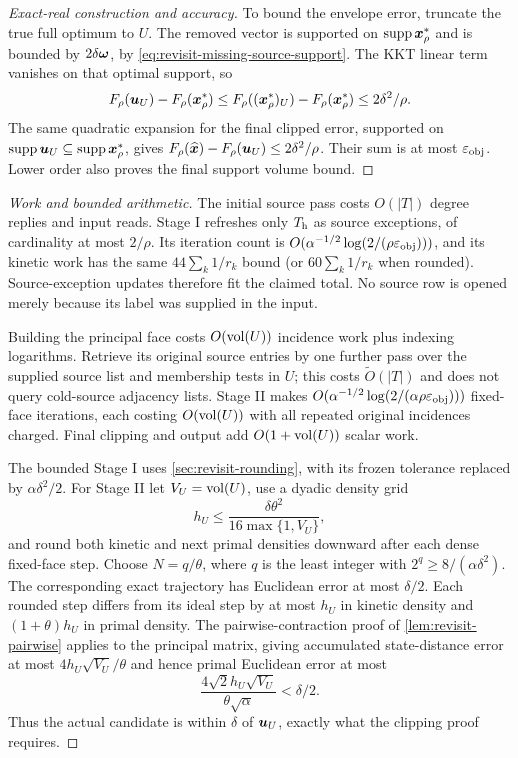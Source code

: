 \begin{proof}[Exact-real construction and accuracy]
To bound the envelope error, truncate the true full optimum to $U$.
The removed vector is supported on $\operatorname{supp}\bm{x}_\rho^*$ and is bounded
by $2\delta\bm{\omega}$, by \cref{eq:revisit-missing-source-support}.
The KKT linear term vanishes on that optimal support, so
\[
 F_\rho(\bm{u}_U)-F_\rho(\bm{x}_\rho^*)
 \leq F_\rho((\bm{x}_\rho^*)_U)-F_\rho(\bm{x}_\rho^*)
 \leq2\delta^2/\rho.
\]
The same quadratic expansion for the final clipped error, supported on
$\operatorname{supp}\bm{u}_U\subseteq\operatorname{supp}\bm{x}_\rho^*$, gives
$F_\rho(\widehat{\bm{x}})-F_\rho(\bm{u}_U)\leq2\delta^2/\rho$.
Their sum is at most $\varepsilon_{\mathrm{obj}}$. Lower order also proves the final support
volume bound.
\end{proof}

\begin{proof}[Work and bounded arithmetic]
The initial source pass costs $O(|T|)$ degree replies and input reads.
Stage I refreshes only $T_{\rm h}$ as source exceptions, of cardinality at
most $2/\rho$. Its iteration count is
$O(\alpha^{-1/2}\log(2/(\rho\varepsilon_{\mathrm{obj}})))$, and its kinetic work has the
same $44\sum_k1/r_k$ bound (or $60\sum_k1/r_k$ when rounded).
Source-exception updates therefore fit the claimed total.
No source row is opened merely because its label was supplied in the input.

Building the principal face costs $O(\operatorname{vol}(U))$ incidence work plus indexing
logarithms. Retrieve its original source entries by one further pass over
the supplied source list and membership tests in $U$; this costs
$\widetilde O(|T|)$ and does not query cold-source adjacency lists.
Stage II makes
$O(\alpha^{-1/2}\log(2/(\alpha\rho\varepsilon_{\mathrm{obj}})))$ fixed-face iterations,
each costing $O(\operatorname{vol}(U))$ with all repeated original incidences charged.
Final clipping and output add $O(1+\operatorname{vol}(U))$ scalar work.

The bounded Stage I uses \cref{sec:revisit-rounding}, with its frozen
tolerance replaced by $\alpha\delta^2/2$. For Stage II let
$V_U=\operatorname{vol}(U)$, use a dyadic density grid
\[
 h_U\leq\frac{\delta\theta^2}{16\max\{1,V_U\}},
\]
and round both kinetic and next primal densities downward after each dense
fixed-face step. Choose $N=q/\theta$, where $q$ is the least integer with
$2^q\geq8/(\alpha\delta^2)$.
The corresponding exact trajectory has Euclidean error at most $\delta/2$.
Each rounded step differs from its ideal step by at most $h_U$ in kinetic
density and $(1+\theta)h_U$ in primal density.
The pairwise-contraction proof of \cref{lem:revisit-pairwise} applies to
the principal matrix, giving accumulated state-distance error at most
$4h_U\sqrt{V_U}/\theta$ and hence primal Euclidean error at most
\[
 \frac{4\sqrt2h_U\sqrt{V_U}}{\theta\sqrt\alpha}<\delta/2.
\]
Thus the actual candidate is within $\delta$ of $\bm{u}_U$, exactly what the
clipping proof requires.


\end{proof}
